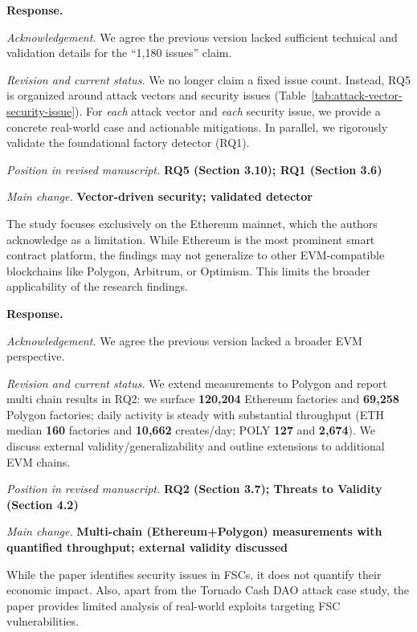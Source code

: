 \documentclass[acmsmall]{acmart}
\begin{document}
	\noindent
	\textbf{Response.}

	\textit{Acknowledgement.} We agree the previous version lacked sufficient technical and validation
	details for the “1,180 issues” claim.

	\textit{Revision and current status.} We no longer claim a fixed issue count. Instead, RQ5 is
	organized around attack vectors and security issues (Table~\ref{tab:attack-vector-security-issue}).
	For \emph{each} attack vector and \emph{each} security issue, we provide a concrete real-world
	case and actionable mitigations. In parallel, we rigorously validate the foundational factory
	detector (RQ1).

	\textit{Position in revised manuscript.} {\color{red}\textbf{RQ5 (Section 3.10); RQ1 (Section 3.6)}}

	\textit{Main change.} {\color{blue}\textbf{Vector-driven security; validated detector}}

	\begin{tcolorbox}
		[commentbox,title=Reviewer \#3 -- Comment 6] The study focuses exclusively on the Ethereum mainnet,
		which the authors acknowledge as a limitation. While Ethereum is the most prominent smart contract
		platform, the findings may not generalize to other EVM-compatible blockchains like Polygon, Arbitrum,
		or Optimism. This limits the broader applicability of the research findings.
	\end{tcolorbox}

	\noindent
	\textbf{Response.}

	\textit{Acknowledgement.} We agree the previous version lacked a broader EVM perspective.

	\textit{Revision and current status.} We extend measurements to Polygon and report multi chain results
	in RQ2: we surface \textbf{120{,}204} Ethereum factories and \textbf{69{,}258} Polygon factories;
	daily activity is steady with substantial throughput (ETH median \textbf{160} factories and \textbf{10{,}662}
	creates/day; POLY \textbf{127} and \textbf{2{,}674}). We discuss external validity/generalizability
	and outline extensions to additional EVM chains.

	\textit{Position in revised manuscript.}
	{\color{red}\textbf{RQ2 (Section 3.7); Threats to Validity (Section 4.2)}}

	\textit{Main change.}
	{\color{blue}\textbf{Multi-chain (Ethereum+Polygon) measurements with quantified throughput; external validity discussed}}

	\begin{tcolorbox}
		[commentbox,title=Reviewer \#3 -- Comment 7] While the paper identifies security issues in FSCs,
		it does not quantify their economic impact. Also, apart from the Tornado Cash DAO attack
		case study, the paper provides limited analysis of real-world exploits targeting FSC vulnerabilities.
	\end{tcolorbox}
\end{document}
